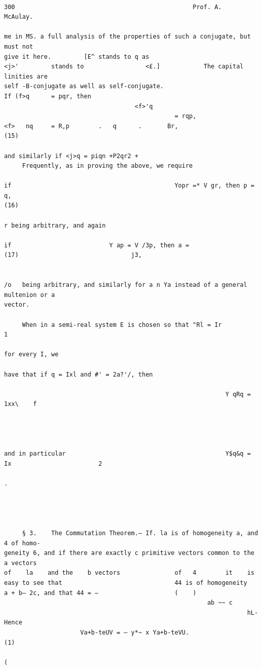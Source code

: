 \documentclass[10pt]{article}
\begin{document}
\clearpage
\begin{verbatim}

300                                                 Prof. A.                       McAulay.

me in MS. a full analysis of the properties of such a conjugate, but must not
give it here.         [E^ stands to q as                            <j>'         stands to                 <£.]            The capital linities are
self -B-conjugate as well as self-conjugate.                                                   If (f>q      = pqr, then
                                    <f>'q
                                               = rqp,                        <f>   nq     = R,p        .   q      .       Br,                               (15)

and similarly if <j>q = piqn +P2qr2 +
     Frequently, as in proving the above, we require

if                                             Yopr =* V gr, then p = q,                                                                                    (16)

r being arbitrary, and again

if                           Y ap = V /3p, then a =                           (17)                               j3,


/o   being arbitrary, and similarly for a n Ya instead of a general multenion or a
vector.

     When in a semi-real system E is chosen so that "Rl = Ir                                                                                  1
                                                                                                                                                  for every I, we

have that if q = Ixl and #' = 2a?'/, then

                                                             Y qRq = 1xx\    f




and in particular                                            Y$q&q = Ix                        2
                                                                                                   .




     § 3.    The Commutation Theorem.— If. la is of homogeneity a, and 4 of homo-
geneity 6, and if there are exactly c primitive vectors common to the a vectors
of    la    and the    b vectors               of   4        it    is        easy to see that                               44 is of homogeneity
a + b— 2c, and that 44 = —                     (    )
                                                        ab ~~ c
                                                                   hL-             Hence
                     Va+b-teUV = — y*~ x Ya+b-teVU.                     (1)
                                                                         (



\end{verbatim}
\end{document}
